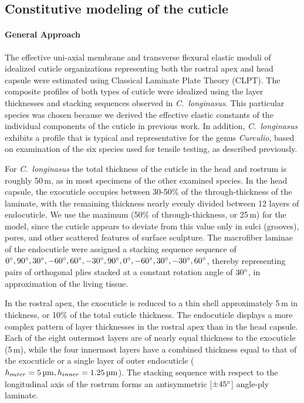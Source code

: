 \documentclass[twocolumn, linenumbers, superscriptaddress, nofootinbib]{revtex4-1}
\begin{document}
		\subsection*{Constitutive modeling of the cuticle}
			\paragraph*{General Approach}
				The effective uni-axial membrane and transverse flexural elastic moduli of idealized cuticle organizations representing both the rostral apex and head capsule were estimated using Classical Laminate Plate Theory (CLPT).
				The composite profiles of both types of cuticle were idealized using the layer thicknesses and stacking sequences observed in \textit{C.~longinasus}.
				This particular species was chosen because we derived the effective elastic constants of the individual components of the cuticle in previous work.
				In addition, \textit{C.~longinasus} exhibits a profile that is typical and representative for the genus \textit{Curculio}, based on examination of the six species used for tensile testing, as described previously.
				
				For \textit{C.~longinasus} the total thickness of the cuticle in the head and rostrum is roughly 50\,{\textmu}m, as in most specimens of the other examined species.
				In the head capsule, the exocuticle occupies between 30-50\% of the through-thickness of the laminate, with the remaining thickness nearly evenly divided between 12 layers of endocuticle.
				We use the maximum (50\% of through-thickness, or 25\,{\textmu}m) for the model, since the cuticle appears to deviate from this value only in sulci (grooves), pores, and other scattered features of surface sculpture.
				The macrofiber laminae of the endocuticle were assigned a stacking sequence sequence of $0\degree, 90\degree, 30\degree, -60\degree, 60\degree, -30\degree, 90\degree, 0\degree, -60\degree, 30\degree, -30\degree, 60\degree$, thereby representing pairs of orthogonal plies stacked at a constant rotation angle of $30\degree$, in approximation of the living tissue.
				
				In the rostral apex, the exocuticle is reduced to a thin shell approximately 5\,{\textmu}m in thickness, or 10\% of the total cuticle thickness.
				The endocuticle displays a more complex pattern of layer thicknesses in the rostral apex than in the head capsule.
				Each of the eight outermost layers are of nearly equal thickness to the exocuticle (5\,{\textmu}m), while the four innermost layers have a combined thickness equal to that of the exocuticle or a single layer of outer endocuticle ($h_{outer}=5\,\text{{\textmu}m}, h_{inner}=1.25\,\text{{\textmu}m}$).
				The stacking sequence with respect to the longitudinal axis of the rostrum forms an antisymmetric [$\pm45\degree$] angle-ply laminate.
				
\end{document}

